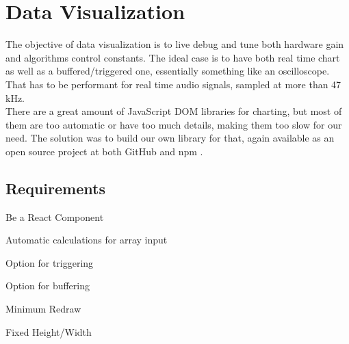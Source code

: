 \section{Data Visualization}
\label{data-visualization}

The objective of data visualization is to live debug and tune both hardware gain
and algorithms control constants. The ideal case is to have both real time chart
as well as a buffered/triggered one, essentially something like an oscilloscope.
That has to be performant for real time audio signals, sampled at more than 47 kHz.\\
There are a great amount of JavaScript DOM libraries for charting, but most of
them are too automatic or have too much details, making them too slow for our need.
The solution was to build our own library for that, again available as an open source
project at both GitHub and npm \cite{react-plotter}.

\subsection{Requirements}
\label{data-visualization-requirements}
\begin{itemlist}
  \item Be a React Component
  \item Automatic calculations for array input
  \item Option for triggering
  \item Option for buffering
  \item Minimum Redraw
  \item Fixed Height/Width
\end{itemlist}

